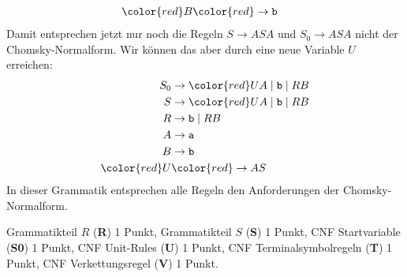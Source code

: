 \begin{loesung}
\begin{enumerate}
\begin{align*}
\color{red}B  &\color{red}\rightarrow \texttt{b}
\end{align*}
Damit entsprechen jetzt nur noch die Regeln $S\rightarrow ASA$ und
$S_0\rightarrow ASA$ nicht der Chomsky-Normalform.
Wir können das aber durch eine neue Variable $U$ erreichen:
\begin{align*}
S_0&\rightarrow {\color{red}U}A \;|\; \texttt{b} \;|\; RB \\
S  &\rightarrow {\color{red}U}A \;|\; \texttt{b} \;|\; RB \\
R  &\rightarrow \texttt{b} \;|\; RB \\
A  &\rightarrow \texttt{a} \\
B  &\rightarrow \texttt{b} \\
\color{red}U  &\color{red}\rightarrow AS
\end{align*}
In dieser Grammatik entsprechen alle Regeln den Anforderungen der
Chomsky-Normalform.
\qedhere
\end{enumerate}
\end{loesung}

\begin{bewertung}
Grammatikteil $R$ ({\bf R}) 1 Punkt,
Grammatikteil $S$ ({\bf S}) 1 Punkt,
CNF Startvariable ({\bf S0}) 1 Punkt,
CNF Unit-Rules ({\bf U}) 1 Punkt,
CNF Terminalsymbolregeln ({\bf T}) 1 Punkt,
CNF Verkettungsregel ({\bf V}) 1 Punkt.
\end{bewertung}

